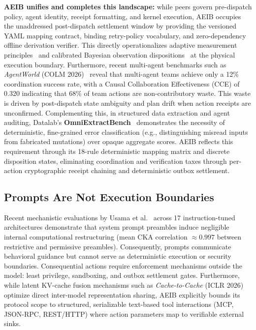 \documentclass[10pt,journal,compsoc]{IEEEtran}
\begin{document}
\textbf{AEIB unifies and completes this landscape:} while peers govern pre-dispatch policy, agent identity, receipt formatting, and kernel execution, AEIB occupies the unaddressed post-dispatch settlement window by providing the versioned YAML mapping contract, binding retry-policy vocabulary, and zero-dependency offline derivation verifier. This directly operationalizes adaptive measurement principles~\cite{adaptive2026} and calibrated Bayesian observation dispositions~\cite{bayesian2026} at the physical execution boundary. Furthermore, recent multi-agent benchmarks such as \emph{AgentWorld} (COLM 2026)~\cite{agentworld2026} reveal that multi-agent teams achieve only a 12\% coordination success rate, with a Causal Collaboration Effectiveness (CCE) of 0.320 indicating that 68\% of team actions are non-contributory waste. This waste is driven by post-dispatch state ambiguity and plan drift when action receipts are unconfirmed. Complementing this, in structured data extraction and agent auditing, Datalab's \textbf{OmniExtractBench}~\cite{omniextract2026} demonstrates the necessity of deterministic, fine-grained error classification (e.g., distinguishing misread inputs from fabricated mutations) over opaque aggregate scores. AEIB reflects this requirement through its 18-rule deterministic mapping matrix and discrete disposition states, eliminating coordination and verification taxes through per-action cryptographic receipt chaining and deterministic outbox settlement.

\subsection{Prompts Are Not Execution Boundaries}
Recent mechanistic evaluations by Usama et al.~\cite{usama2026systemprompt} across 17 instruction-tuned architectures demonstrate that system prompt preambles induce negligible internal computational restructuring (mean CKA correlation $\approx 0.997$ between restrictive and permissive preambles). Consequently, prompts communicate behavioral guidance but cannot serve as deterministic execution or security boundaries. Consequential actions require enforcement mechanisms outside the model: least privilege, sandboxing, and outbox settlement gates. Furthermore, while latent KV-cache fusion mechanisms such as \emph{Cache-to-Cache} (ICLR 2026)~\cite{fu2026c2c} optimize direct inter-model representation sharing, AEIB explicitly bounds its protocol scope to structured, serializable text-based tool interactions (MCP, JSON-RPC, REST/HTTP) where action parameters map to verifiable external sinks.
\end{document}
